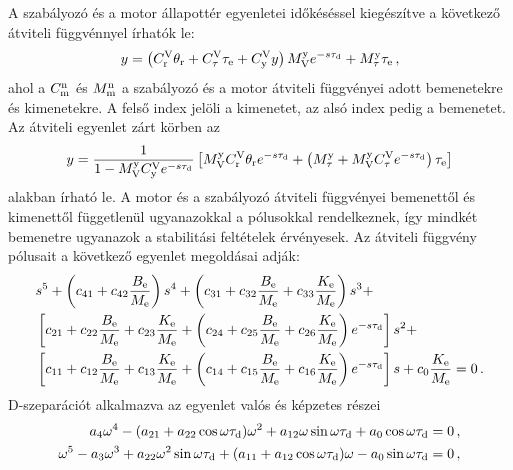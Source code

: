 A szabályozó és a motor állapottér egyenletei időkéséssel kiegészítve a következő átviteli 
függvénnyel írhatók le:
\begin{align}
    \begin{split}
        y = \left(C^{\mathrm{V}}_{\mathrm{r}} \theta_{\mathrm{r}} + 
        C^{\mathrm{V}}_{\mathrm{\tau}} \tau_{\mathrm{e}} +
        C^{\mathrm{V}}_{\mathrm{y}} y\right)M^{\mathrm{y}}_{\mathrm{V}} e^{-s\tau_{\mathrm{d}}} +
        M^{\mathrm{y}}_{\mathrm{\tau}} \tau_{\mathrm{e}}\,,
    \end{split}
\end{align}
ahol a \(C^{\mathrm{n}}_{\mathrm{m}}\) és \(M^{\mathrm{n}}_{\mathrm{m}}\) a szabályozó és a motor átviteli függvényei adott 
bemenetekre és kimenetekre. A felső index jelöli a kimenetet, az alsó index pedig a bemenetet.
Az átviteli egyenlet zárt körben az
\begin{align}
    \begin{split}
        y = \frac{1}{1 - M^{\mathrm{y}}_{\mathrm{V}} C^{\mathrm{V}}_{\mathrm{y}} e^{-s\tau_{\mathrm{d}}}}
        \left[
            M^{\mathrm{y}}_{\mathrm{V}} C^{\mathrm{V}}_{\mathrm{r}} \theta_{\mathrm{r}} e^{-s\tau_{\mathrm{d}}} + 
            \left(M^{\mathrm{y}}_{\mathrm{\tau}} + M^{\mathrm{y}}_{\mathrm{V}} C^{\mathrm{V}}_{\mathrm{\tau}} e^{-s\tau_{\mathrm{d}}}\right) \tau_{\mathrm{e}}
        \right]
    \end{split}
\end{align}
alakban írható le. A motor és a szabályozó átviteli függvényei bemenettől és kimenettől 
függetlenül ugyanazokkal a pólusokkal rendelkeznek, így mindkét bemenetre ugyanazok a stabilitási 
feltételek érvényesek. Az átviteli függvény pólusait a következő egyenlet megoldásai adják:
\begin{align}\label{eq:delay_characteristic}
    \begin{split}
        &s^5 + 
        \left(c_{41} + c_{42}\frac{B_{\mathrm{e}}}{M_{\mathrm{e}}}\right)s^4 +
        \left(c_{31} + c_{32}\frac{B_{\mathrm{e}}}{M_{\mathrm{e}}} + c_{33}\frac{K_{\mathrm{e}}}{M_{\mathrm{e}}}\right)s^3 + \\
        &\left[c_{21} + c_{22}\frac{B_{\mathrm{e}}}{M_{\mathrm{e}}} + c_{23}\frac{K_{\mathrm{e}}}{M_{\mathrm{e}}} + \left(
        c_{24} + c_{25}\frac{B_{\mathrm{e}}}{M_{\mathrm{e}}} + c_{26}\frac{K_{\mathrm{e}}}{M_{\mathrm{e}}}\right)e^{-s\tau_{\mathrm{d}}}\right]s^2 + \\
        &\left[c_{11} + c_{12}\frac{B_{\mathrm{e}}}{M_{\mathrm{e}}} + c_{13}\frac{K_{\mathrm{e}}}{M_{\mathrm{e}}} + \left(
        c_{14} + c_{15}\frac{B_{\mathrm{e}}}{M_{\mathrm{e}}} + c_{16}\frac{K_{\mathrm{e}}}{M_{\mathrm{e}}}\right)e^{-s\tau_{\mathrm{d}}}\right]s + 
        c_0 \frac{K_{\mathrm{e}}}{M_{\mathrm{e}}} = 0\,.
    \end{split}
\end{align}
D-szeparációt alkalmazva az egyenlet valós és 
képzetes részei
\begin{align}\label{eq:delay_complex_separation}
    \begin{split}
        a_4\omega^4-(a_{21} + a_{22}\cos{\omega\tau_{\mathrm{d}}})\omega^2+a_{12}\omega\sin{\omega\tau_{\mathrm{d}}} + a_0\cos{\omega\tau_{\mathrm{d}}} &= 0\,, \\
        \omega^5 -a_3\omega^3 + a_{22}\omega^2\sin{\omega\tau_{\mathrm{d}}} + (a_{11} + a_{12}\cos{\omega\tau_{\mathrm{d}}})\omega - a_0\sin{\omega\tau_{\mathrm{d}}}  &= 0\,,
    \end{split}
\end{align}
